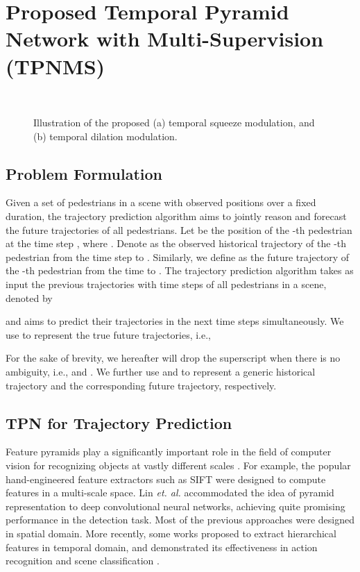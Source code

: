 \documentclass[letterpaper]{article} \usepackage{aaai21}  \usepackage{times}  \usepackage{helvet} \usepackage{courier}  \usepackage[hyphens]{url}  \usepackage{graphicx} \urlstyle{rm} \def\UrlFont{\rm}  \usepackage{natbib}  \usepackage{caption} \frenchspacing  \setlength{\pdfpagewidth}{8.5in}  \setlength{\pdfpageheight}{11in}
\begin{document}
\section{Proposed Temporal Pyramid Network with Multi-Supervision (TPNMS)} \label{sec:proposed}

\begin{figure*}[!t]
	\centering
	~~~~~~~~~~
	\caption{Illustration of the proposed (a) temporal squeeze modulation, and (b) temporal dilation modulation.}
	\label{fig:TPL}
\end{figure*}
\subsection{Problem Formulation}
Given a set of  pedestrians in a scene with observed positions over a fixed duration, the trajectory prediction algorithm aims to jointly reason and forecast the future trajectories of all pedestrians. Let  be the position of the -th pedestrian at the time step , where . Denote  as the observed historical trajectory of the -th pedestrian from the time step  to . Similarly, we define  as the future trajectory of the -th pedestrian from the time  to .
The trajectory prediction algorithm takes as input the previous trajectories with  time steps of all pedestrians in a scene, denoted by

and aims to predict their trajectories in the next  time steps simultaneously. We use  to represent the true future trajectories, i.e.,


For the sake of brevity, we hereafter will drop the superscript when there is no ambiguity, i.e.,  and . We further use  and  to represent a generic historical trajectory and the corresponding future trajectory, respectively.


\subsection{TPN for Trajectory Prediction}\label{sec:TPN}
Feature pyramids play a significantly important role in the field of computer vision for recognizing objects at vastly different scales \cite{he2015spatial}. For example, the popular hand-engineered feature extractors such as SIFT \cite{Lowe04} were designed to compute features in a multi-scale space. Lin \textit{et. al.} \cite{lin2017feature} accommodated the idea of pyramid representation to deep convolutional neural networks, achieving quite promising performance in the detection task. Most of the previous approaches were designed in spatial domain. More recently, some works proposed to extract hierarchical features in temporal domain, and demonstrated its effectiveness in action recognition \cite{yang2020temporal} and scene classification \cite{huang2019attentive}.
\end{document}
